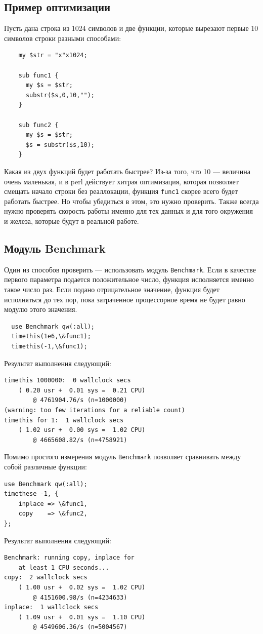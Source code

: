 \subsection{Пример оптимизации}
Пусть дана строка из 1024 символов и две функции, которые вырезают первые 10 символов строки разными способами:
\begin{verbatim}
    my $str = "x"x1024;

    sub func1 {
      my $s = $str;
      substr($s,0,10,"");
    }

    sub func2 {
      my $s = $str;
      $s = substr($s,10);
    }
\end{verbatim}


Какая из двух функций будет работать быстрее? Из-за того, что 10 --- величина очень маленькая, и в perl действует хитрая оптимизация, которая позволяет смещать начало строки без реаллокации, функция \verb|func1| скорее всего будет работать быстрее. Но чтобы убедиться в этом, это нужно проверить. Также всегда нужно проверять скорость работы именно для тех данных и для того окружения и железа, которые будут в реальной работе.

\subsection{Модуль Benchmark}
Один из способов проверить --- использовать модуль \verb|Benchmark|. Если в качестве первого параметра подается положительное число, функция исполняется именно такое число раз. Если подано отрицательное значение, функция будет исполняться до тех пор, пока затраченное процессорное время не будет равно модулю этого значения.
\begin{verbatim}
  use Benchmark qw(:all);
  timethis(1e6,\&func1);
  timethis(-1,\&func1);
\end{verbatim}
Результат выполнения следующий:
\begin{verbatim}
timethis 1000000:  0 wallclock secs
    ( 0.20 usr +  0.01 sys =  0.21 CPU)
        @ 4761904.76/s (n=1000000)
(warning: too few iterations for a reliable count)
timethis for 1:  1 wallclock secs
    ( 1.02 usr +  0.00 sys =  1.02 CPU)
        @ 4665608.82/s (n=4758921)
\end{verbatim}
Помимо простого измерения модуль \verb|Benchmark| позволяет сравнивать между собой различные функции:
\begin{verbatim}
use Benchmark qw(:all);
timethese -1, {
    inplace => \&func1,
    copy    => \&func2,
};
\end{verbatim}
Результат выполнения следующий:
\begin{verbatim}
Benchmark: running copy, inplace for
    at least 1 CPU seconds...
copy:  2 wallclock secs
    ( 1.00 usr +  0.02 sys =  1.02 CPU)
        @ 4151600.98/s (n=4234633)
inplace:  1 wallclock secs
    ( 1.09 usr +  0.01 sys =  1.10 CPU)
        @ 4549606.36/s (n=5004567)
\end{verbatim}

